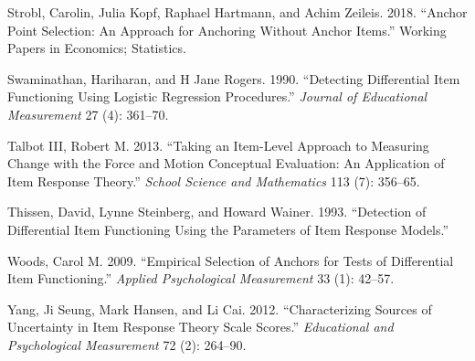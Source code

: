 \documentclass[
  11pt,
]{article}
\begin{document}
\leavevmode\hypertarget{ref-strobl2018anchor}{}%
Strobl, Carolin, Julia Kopf, Raphael Hartmann, and Achim Zeileis. 2018. ``Anchor Point Selection: An Approach for Anchoring Without Anchor Items.'' Working Papers in Economics; Statistics.

\leavevmode\hypertarget{ref-swaminathan1990detecting}{}%
Swaminathan, Hariharan, and H Jane Rogers. 1990. ``Detecting Differential Item Functioning Using Logistic Regression Procedures.'' \emph{Journal of Educational Measurement} 27 (4): 361--70.

\leavevmode\hypertarget{ref-talbot2013taking}{}%
Talbot III, Robert M. 2013. ``Taking an Item-Level Approach to Measuring Change with the Force and Motion Conceptual Evaluation: An Application of Item Response Theory.'' \emph{School Science and Mathematics} 113 (7): 356--65.

\leavevmode\hypertarget{ref-thissen1993detection}{}%
Thissen, David, Lynne Steinberg, and Howard Wainer. 1993. ``Detection of Differential Item Functioning Using the Parameters of Item Response Models.''

\leavevmode\hypertarget{ref-woods2009empirical}{}%
Woods, Carol M. 2009. ``Empirical Selection of Anchors for Tests of Differential Item Functioning.'' \emph{Applied Psychological Measurement} 33 (1): 42--57.

\leavevmode\hypertarget{ref-yang2012characterizing}{}%
Yang, Ji Seung, Mark Hansen, and Li Cai. 2012. ``Characterizing Sources of Uncertainty in Item Response Theory Scale Scores.'' \emph{Educational and Psychological Measurement} 72 (2): 264--90.
\end{document}

